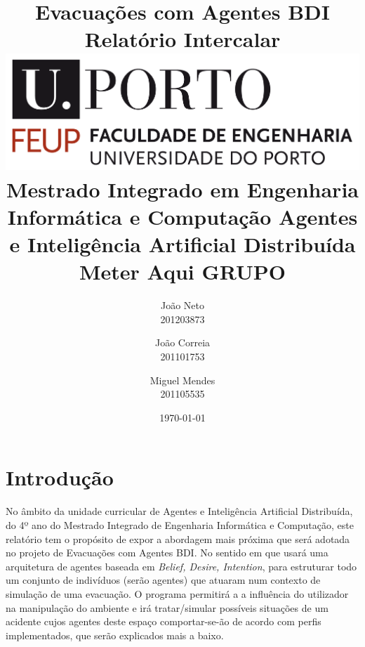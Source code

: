 \documentclass[a4paper,11pt]{article}
\begin{document}
\title{\Huge\textbf{Evacuações com Agentes BDI}\linebreak\linebreak\linebreak
\Large\textbf{Relatório Intercalar}\linebreak\linebreak
\linebreak\linebreak
\includegraphics[scale=0.1]{feup-logo.png}\linebreak\linebreak
\linebreak\linebreak
\Large{Mestrado Integrado em Engenharia Informática e Computação} \linebreak\linebreak
\Large{Agentes e Inteligência Artificial Distribuída}\linebreak\linebreak
\Large{Meter Aqui GRUPO}}
\author{
João Neto \\ 201203873 \\
\and
João Correia\\ 201101753 \\
\and
Miguel Mendes\\ 201105535 \\}
\date{\today}

\maketitle

\newpage

\tableofcontents

\newpage
\section{Introdução}
No âmbito da unidade curricular de Agentes e Inteligência Artificial Distribuída, do 4º ano do Mestrado Integrado de Engenharia Informática e Computação, este relatório tem o propósito de expor a abordagem mais próxima que será adotada no projeto de Evacuações com Agentes BDI.
No sentido em que usará uma arquitetura de agentes baseada em \textit{Belief, Desire, Intention}, para estruturar todo um conjunto de indivíduos (serão agentes) que atuaram num contexto de simulação de uma evacuação. O programa permitirá a a influência do utilizador na manipulação do ambiente e irá tratar/simular possíveis situações de um acidente cujos agentes deste espaço comportar-se-ão de acordo com perfis implementados, que serão explicados mais a baixo.
\end{document}
